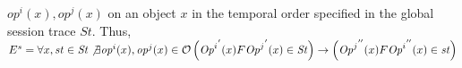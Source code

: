 \documentclass{sig-alternate-05-2015}
\begin{document}
${\mathit{op}^i}(x), {\mathit{op}^j}(x)$  on an object $x$ in the temporal order specified in the global session trace $\mathit{St}$. Thus, $E^s = \forall x, \mathit{st} \in \mathit{St} \not\exists {\mathit{op}^i}(x), {\mathit{op}^j}(x) \in \mathcal{O}  \\ \left( {\mathit{Op}^i}^{'}(x) F {\mathit{Op}^j}^{'} (x) \in \mathit{St} \right) \rightarrow  
 \left(  {\mathit{Op}^j}^{''}(x) F {\mathit{Op}^i}^{''} (x) \in \mathit{st} \right)$ %
\end{document}
